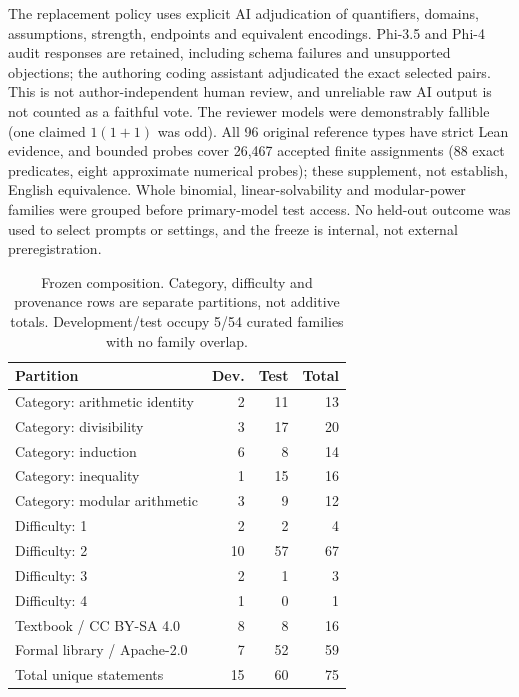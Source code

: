 \documentclass[runningheads,a4paper]{llncs}
\begin{document}
The replacement policy uses explicit AI adjudication of quantifiers, domains,
assumptions, strength, endpoints and equivalent encodings. Phi-3.5 and Phi-4 audit
responses are retained, including schema failures and unsupported objections; the
authoring coding assistant adjudicated the exact selected pairs. This is not
author-independent human review, and unreliable raw AI output is not counted as a
faithful vote. The reviewer models were demonstrably fallible (one claimed
$1(1+1)$ was odd). All 96 original reference types have strict Lean evidence, and
bounded probes cover 26,467 accepted finite assignments (88 exact predicates, eight
approximate numerical probes); these supplement, not establish, English equivalence.
Whole binomial, linear-solvability and modular-power families were grouped before
primary-model test access. No held-out outcome was used to select prompts or
settings, and the freeze is internal, not external preregistration.

\begin{table}[tbp]
\caption{Frozen composition. Category, difficulty and provenance rows are separate
partitions, not additive totals. Development/test occupy 5/54 curated families with
no family overlap.}
\label{tab:comp}
\centering\small
\begin{tabular}{lrrr}
\toprule
Partition & Dev. & Test & Total\\
\midrule
Category: arithmetic identity & 2 & 11 & 13\\
Category: divisibility        & 3 & 17 & 20\\
Category: induction           & 6 & 8  & 14\\
Category: inequality          & 1 & 15 & 16\\
Category: modular arithmetic  & 3 & 9  & 12\\
Difficulty: 1                    & 2 & 2  & 4\\
Difficulty: 2                    & 10 & 57 & 67\\
Difficulty: 3                    & 2 & 1  & 3\\
Difficulty: 4                    & 1 & 0  & 1\\
Textbook / CC BY-SA 4.0       & 8 & 8  & 16\\
Formal library / Apache-2.0   & 7 & 52 & 59\\
\midrule
Total unique statements       & 15 & 60 & 75\\
\bottomrule
\end{tabular}
\end{table}
\end{document}
